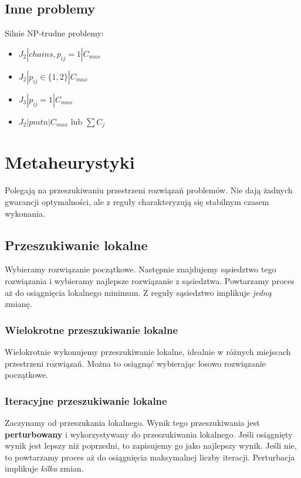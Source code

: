\documentclass{../notatki}
\begin{document}
\subsection{Inne problemy}

Silnie NP-trudne problemy:
\begin{itemize}
  \item $J_2|chains, p_{ij} = 1|C_{max}$
  \item $J_2|p_{ij} \in \{1, 2\}|C_{max}$
  \item $J_3|p_{ij} = 1|C_{max}$
  \item $J_2|pmtn|C_{max} \text{ lub } \sum C_j$
\end{itemize}

\section{Metaheurystyki}

Polegają na przeszukiwaniu przestrzeni rozwiązań problemów. Nie dają żadnych
gwarancji optymalności, ale z reguły charakteryzują się stabilnym
czasem wykonania.

\subsection{Przeszukiwanie lokalne}

Wybieramy rozwiązanie początkowe. Następnie znajdujemy sąsiedztwo
tego rozwiązania
i wybieramy najlepsze rozwiązanie z sąsiedztwa. Powtarzamy proces aż
do osiągnięcia
lokalnego minimum. Z reguły sąsiedztwo implikuje \textit{jedną} zmianę.

\subsubsection{Wielokrotne przeszukiwanie lokalne}

Wielokrotnie wykonujemy przeszukiwanie lokalne, idealnie w różnych miejscach
przestrzeni rozwiązań. Można to osiągnąć wybierając losowo
rozwiązanie początkowe.

\subsubsection{Iteracyjne przeszukiwanie lokalne}

Zaczynamy od przeszukania lokalnego. Wynik tego przeszukiwania jest
\textbf{perturbowany} i wykorzystywany do przeszukiwania lokalnego. Jeśli
osiągnięty wynik jest lepszy niż poprzedni, to zapisujemy go jako najlepszy
wynik. Jeśli nie, to powtarzamy proces aż do osiągnięcia maksymalnej liczby
iteracji. Perturbacja implikuje \textit{kilka} zmian.
\end{document}
